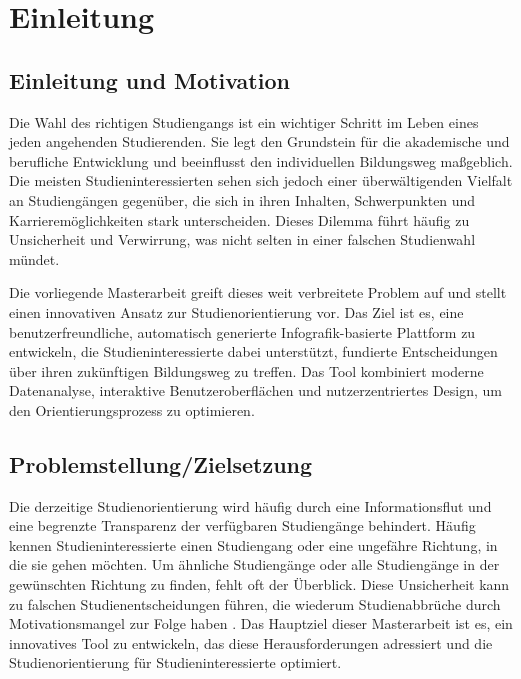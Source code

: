 \section{Einleitung}\label{einleitung}
\subsection{Einleitung und Motivation}\label{einleitung-und-motivation}
Die Wahl des richtigen Studiengangs ist ein wichtiger Schritt im Leben eines
jeden angehenden Studierenden. Sie legt den Grundstein für die akademische und
berufliche Entwicklung und beeinflusst den individuellen Bildungsweg maßgeblich.
Die meisten Studieninteressierten sehen sich jedoch einer überwältigenden
Vielfalt an Studiengängen gegenüber, die sich in ihren Inhalten, Schwerpunkten
und Karrieremöglichkeiten stark unterscheiden. Dieses Dilemma führt häufig zu
Unsicherheit und Verwirrung, was nicht selten in einer falschen Studienwahl
mündet. \parencite{verbesserung-der-studienorientierung}

Die vorliegende Masterarbeit greift dieses weit verbreitete Problem auf und
stellt einen innovativen Ansatz zur Studienorientierung vor. Das Ziel ist es,
eine benutzerfreundliche, automatisch generierte Infografik-basierte Plattform
zu entwickeln, die Studieninteressierte dabei unterstützt, fundierte
Entscheidungen über ihren zukünftigen Bildungsweg zu treffen. Das Tool
kombiniert moderne Datenanalyse, interaktive Benutzeroberflächen und
nutzerzentriertes Design, um den Orientierungsprozess zu optimieren.

\subsection{Problemstellung/Zielsetzung}\label{problemstellung-zielsetzung}
Die derzeitige Studienorientierung wird häufig durch eine Informationsflut und
eine begrenzte Transparenz der verfügbaren Studiengänge behindert. Häufig kennen
Studieninteressierte einen Studiengang oder eine ungefähre Richtung, in die sie
gehen möchten. Um ähnliche Studiengänge oder alle Studiengänge in der
gewünschten Richtung zu finden, fehlt oft der Überblick.
\parencite{verbesserung-der-studienorientierung} Diese Unsicherheit kann
zu falschen Studienentscheidungen führen, die wiederum Studienabbrüche durch
Motivationsmangel zur Folge haben \parencite{ursachen-studienabbruch}. Das
Hauptziel dieser Masterarbeit ist es, ein innovatives Tool zu entwickeln, das
diese Herausforderungen adressiert und die Studienorientierung für
Studieninteressierte optimiert.

